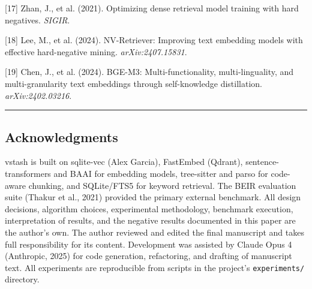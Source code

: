 \documentclass[
  11pt]{article}
\begin{document}
{[}17{]} Zhan, J., et al. (2021). Optimizing dense retrieval model training with hard negatives. \emph{SIGIR}.

{[}18{]} Lee, M., et al. (2024). NV-Retriever: Improving text embedding models with effective hard-negative mining. \emph{arXiv:2407.15831}.

{[}19{]} Chen, J., et al. (2024). BGE-M3: Multi-functionality, multi-linguality, and multi-granularity text embeddings through self-knowledge distillation. \emph{arXiv:2402.03216}.

\begin{center}\rule{0.5\linewidth}{0.5pt}\end{center}

\subsection{Acknowledgments}\label{acknowledgments}

vstash is built on sqlite-vec (Alex Garcia), FastEmbed (Qdrant), sentence-transformers and BAAI for embedding models, tree-sitter and parso for code-aware chunking, and SQLite/FTS5 for keyword retrieval. The BEIR evaluation suite (Thakur et al., 2021) provided the primary external benchmark. All design decisions, algorithm choices, experimental methodology, benchmark execution, interpretation of results, and the negative results documented in this paper are the author's own. The author reviewed and edited the final manuscript and takes full responsibility for its content. Development was assisted by Claude Opus 4 (Anthropic, 2025) for code generation, refactoring, and drafting of manuscript text. All experiments are reproducible from scripts in the project's \texttt{experiments/} directory.
\end{document}
